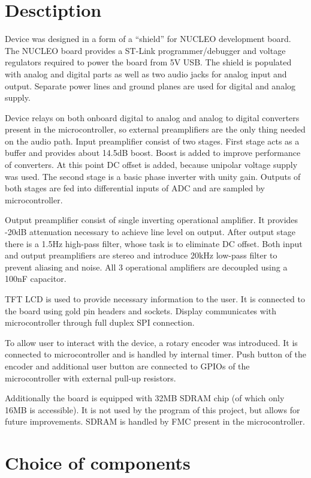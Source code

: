 \documentclass[a4paper,twoside,12pt]{book}
\begin{document}
\section{Desctiption}
Device was designed in a form of a “shield” for NUCLEO development board.
The NUCLEO board provides a ST-Link programmer/debugger
and voltage regulators required to power the board from 5V USB.
The shield is populated with analog and digital parts
as well as two audio jacks for analog input and output.
Separate power lines and ground planes are used for digital and analog supply.

Device relays on both onboard digital to analog
and analog to digital converters present in the microcontroller,
so external preamplifiers are the only thing needed on the audio path.
Input preamplifier consist of two stages.
First stage acts as a buffer and provides about 14.5dB boost.
Boost is added to improve performance of converters.
At this point DC offset is added, because unipolar voltage supply was used.
The second stage is a basic phase inverter with unity gain.
Outputs of both stages are fed into differential inputs of ADC
and are sampled by microcontroller.

Output preamplifier consist of single inverting operational amplifier.
It provides -20dB attenuation necessary to achieve line level on output.
After output stage there is a 1.5Hz high-pass filter,
whose task is to eliminate DC offset.
Both input and output preamplifiers are stereo and introduce 20kHz low-pass filter
to prevent aliasing and noise.
All 3 operational amplifiers are decoupled using a 100nF capacitor.
\cite{ST:DAC}

TFT LCD is used to provide necessary information to the user.
It is connected to the board using gold pin headers and sockets.
Display communicates with microcontroller through full duplex SPI connection.

To allow user to interact with the device, a rotary encoder was introduced.
It is connected to microcontroller and is handled by internal timer.
Push button of the encoder and additional user button are connected
to GPIOs of the microcontroller with external pull-up resistors.

Additionally the board is equipped with 32MB SDRAM chip
(of which only 16MB is accessible).
It is not used by the program of this project, but allows for future improvements.
SDRAM is handled by FMC present in the microcontroller.

\section{Choice of components}
\end{document}

